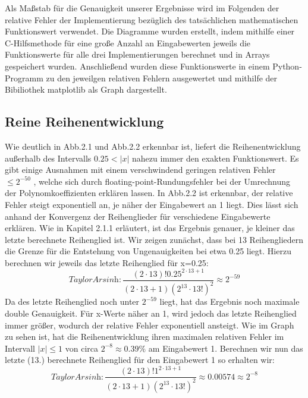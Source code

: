 \documentclass[course=erap] {aspdoc}
\begin{document}
    \begin{figure}
        \caption{}
    \end{figure}
    Als Maßstab für die Genauigkeit unserer Ergebnisse wird im Folgenden der relative Fehler der Implementierung bezüglich des tatsächlichen mathematischen Funktionswert verwendet. Die Diagramme wurden erstellt, indem mithilfe einer C-Hilfsmethode für eine große Anzahl an Eingabewerten jeweils die Funktionswerte für alle drei Implementierungen berechnet und in Arrays gespeichert wurden. Anschließend wurden diese Funktionswerte in einem Python-Programm zu den jeweilgen relativen Fehlern ausgewertet und mithilfe der Bibiliothek matplotlib als Graph dargestellt.
    
    \subsection{Reine Reihenentwicklung}
    Wie deutlich in Abb.2.1 und Abb.2.2 erkennbar ist, liefert die Reihenentwicklung außerhalb des Intervalls $0.25<|x|$ nahezu immer den exakten Funktionswert. Es gibt einige Ausnahmen mit einem verschwindend geringen relativen Fehler $\leq2^{-50}$ , welche sich durch floating-point-Rundungsfehler bei der Umrechnung der Polynomkoeffizienten erklären lassen.
    In Abb.2.2 ist erkennbar, der relative Fehler steigt exponentiell an, je näher der Eingabewert an 1 liegt. Dies lässt sich anhand der Konvergenz der Reihenglieder für verschiedene Eingabewerte erklären. Wie in Kapitel 2.1.1 erläutert, ist das Ergebnis genauer, je kleiner das letzte berechnete Reihenglied ist.
    Wir zeigen zunächst, dass bei 13 Reihengliedern die Grenze für die Entstehung von Ungenauigkeiten bei etwa 0.25 liegt. Hierzu berechnen wir jeweils das letzte Reihenglied für x=0.25:
    \[
    \textit{TaylorArsinh}: \frac{(2\cdot13)!0.25^{2\cdot13 + 1}}{(2\cdot13 + 1)(2^13\cdot13!)^2} \approx 2^{-59}
    \]
    Da des letzte Reihenglied noch unter $2^{-59}$ liegt, hat das Ergebnis noch maximale double Genauigkeit. Für x-Werte näher an 1, wird jedoch das letzte Reihenglied immer größer, wodurch der relative Fehler exponentiell ansteigt. Wie im Graph zu sehen ist, hat die Reihenentwicklung ihren maximalen relativen Fehler im Intervall $|x|\leq1$ von circa $2^{-8} \approx 0.39\%$ am Eingabewert 1.
    Berechnen wir nun das letzte (13.) berechnete Reihenglied für den Eingabewert 1 so erhalten wir:
    \[
    \textit{TaylorArsinh}: \frac{(2\cdot13)!1^{2\cdot13 + 1}}{(2\cdot13 + 1)(2^13\cdot13!)^2} \approx 0.00574 \approx 2^{-8}
    \]
\end{document}
